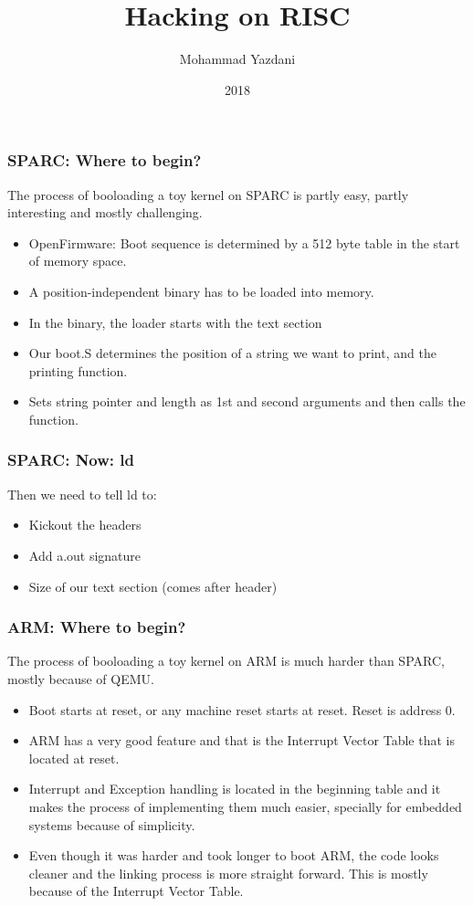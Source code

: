 \documentclass{beamer}
\title{Hacking on RISC}
\author{Mohammad Yazdani}
\institute{CS 850}
\date{2018}
\begin{document}
 
\frame{\titlepage}
 
\begin{frame}
\frametitle{SPARC: Where to begin?}
The process of booloading a toy kernel on SPARC is partly easy, partly interesting and mostly challenging.
\begin{itemize}
    \item OpenFirmware: Boot sequence is determined by a 512 byte table in the start of memory space.
    \item A position-independent binary has to be loaded into memory.
    \item In the binary, the loader starts with the text section
    \item Our boot.S determines the position of a string we want to print, and the printing function.
    \item Sets string pointer and length as 1st and second arguments and then calls the function.
\end{itemize}
\end{frame}

\begin{frame}
    \frametitle{SPARC: Now: ld}
    Then we need to tell ld to:
    \begin{itemize}
        \item Kickout the headers
        \item Add a.out signature
        \item Size of our text section (comes after header)
    \end{itemize}
\end{frame}

\begin{frame}
    \frametitle{ARM: Where to begin?}
    The process of booloading a toy kernel on ARM is much harder than SPARC, mostly because of QEMU.
    \begin{itemize}
        \item Boot starts at reset, or any machine reset starts at reset. Reset is address 0.
        \item ARM has a very good feature and that is the Interrupt Vector Table that is located at reset.
        \item Interrupt and Exception handling is located in the beginning table and it makes the process of implementing them much easier, specially for embedded systems because of simplicity.
        \item Even though it was harder and took longer to boot ARM, the code looks cleaner and the linking process is more straight forward. This is mostly because of the Interrupt Vector Table.
    \end{itemize}
\end{frame}
\end{document}

